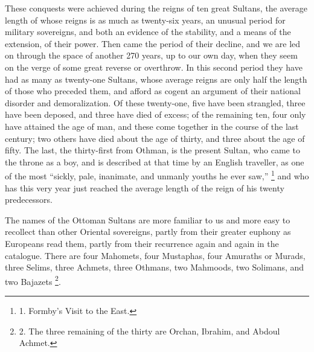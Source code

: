 These conquests were achieved
during the reigns of ten great Sultans, the average length of whose
reigns is as much as twenty-six years, an unusual period for
military sovereigns, and both an evidence of the stability, and a
means of the extension, of their power. Then came the period of their
decline, and we are led on through the space of another 270 years, up
to our own day, when they seem on the verge of some great reverse or
overthrow. In this second period they have had as many as twenty-one
Sultans, whose average reigns are only half the length of those who
preceded them, and afford as cogent an argument of their national
disorder and demoralization. Of these twenty-one, five have been
strangled, three have been deposed, and three have died of excess; of
the remaining ten, four only have attained the age of man, and these
come together in the course of the last century; two others have died
about the age of thirty, and three about the age of fifty. The last,
the thirty-first from Othman, is the present Sultan, who came to the
throne as a boy, and is described at that time by an English traveller,
as one of the most ``sickly, pale, inanimate, and unmanly youths he
ever saw,'' \footnote{1. Formby's Visit to the East.} and who has
this very year just reached the average length of the reign of his
twenty predecessors.

The names of the Ottoman
Sultans are more familiar to us and more easy to recollect than other
Oriental sovereigns, partly from their greater euphony as Europeans
read them, partly from their recurrence again and again in the
catalogue. There are four Mahomets, four Mustaphas, four Amuraths or
Murads, three Selims, three Achmets, three Othmans, two Mahmoods, two
Solimans, and two Bajazets \footnote{2.
The three remaining of the thirty are Orchan, Ibrahim, and Abdoul
Achmet.}.

